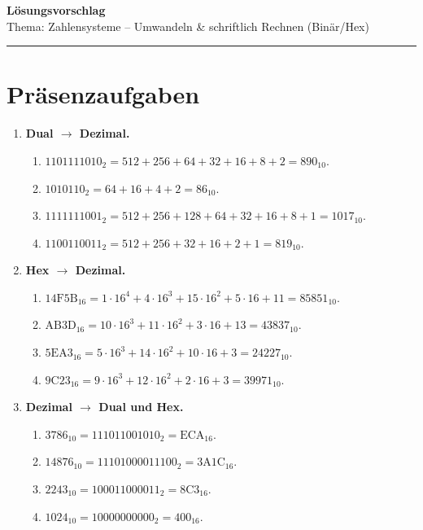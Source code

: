 \documentclass[11pt,a4paper]{scrartcl}
\newcommand{\sheettitle}[2]{%
	{\Large\bfseries #1}\\[-0.2em]
	{\normalsize #2}\par\hrule\vspace{1.0em}
}
\begin{document}
	
	\sheettitle{Lösungsvorschlag}{Thema: Zahlensysteme – Umwandeln \& schriftlich Rechnen (Binär/Hex)}
	
	\section*{Präsenzaufgaben}
	
	\begin{enumerate}[leftmargin=*,label=\textbf{Aufgabe~\arabic*:}, itemsep=0.9em]
		
		\item \textbf{Dual \(\to\) Dezimal.}
		\begin{enumerate}[label*=\alph*)]
			\item \(1101111010_2 = 512+256+64+32+16+8+2 = \boxed{890_{10}}\).
			\item \(1010110_2 = 64+16+4+2 = \boxed{86_{10}}\).
			\item \(1111111001_2 = 512+256+128+64+32+16+8+1 = \boxed{1017_{10}}\).
			\item \(1100110011_2 = 512+256+32+16+2+1 = \boxed{819_{10}}\).
		\end{enumerate}
		
		\item \textbf{Hex \(\to\) Dezimal.}
		\begin{enumerate}[label*=\alph*)]
			\item \(\mathrm{14F5B}_{16} = 1\cdot16^4 + 4\cdot16^3 + 15\cdot16^2 + 5\cdot16 + 11
			= \boxed{85851_{10}}\).
			\item \(\mathrm{AB3D}_{16} = 10\cdot16^3 + 11\cdot16^2 + 3\cdot16 + 13
			= \boxed{43837_{10}}\).
			\item \(\mathrm{5EA3}_{16} = 5\cdot16^3 + 14\cdot16^2 + 10\cdot16 + 3
			= \boxed{24227_{10}}\).
			\item \(\mathrm{9C23}_{16} = 9\cdot16^3 + 12\cdot16^2 + 2\cdot16 + 3
			= \boxed{39971_{10}}\).
		\end{enumerate}
		
		\item \textbf{Dezimal \(\to\) Dual und Hex.}
		\begin{enumerate}[label*=\alph*)]
			\item \(3786_{10} = \boxed{111011001010_2} = \boxed{\mathrm{ECA}_{16}}\).
			\item \(14876_{10} = \boxed{11101000011100_2} = \boxed{\mathrm{3A1C}_{16}}\).
			\item \(2243_{10} = \boxed{100011000011_2} = \boxed{\mathrm{8C3}_{16}}\).
			\item \(1024_{10} = \boxed{10000000000_2} = \boxed{\mathrm{400}_{16}}\).
		\end{enumerate}
		

\end{enumerate}
\end{document}
